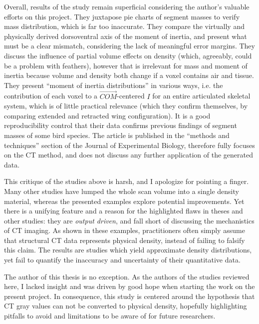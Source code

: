 Overall, results of the \citet{Durston2022} study remain superficial considering the author's valuable efforts on this project.
They juxtapose pie charts of segment masses to verify mass distribution, which is far too inaccurate.
They compare the virtually and physically derived dorsoventral axis of the moment of inertia, and present what must be a clear mismatch, considering the lack of meaningful error margins.
They discuss the influence of partial volume effects on density (which, agreeably, could be a problem with feathers), however that is irrelevant for mass and moment of inertia because volume and density both change if a voxel contains air and tissue.
They present ``moment of inertia distributions'' in various ways, i.e. the contribution of each voxel to a \(\vec{COM}\)-centered \(I\) for an entire articulated skeletal system, which is of little practical relevance (which they confirm themselves, by comparing extended and retracted wing configuration).
It is a good reproducibility control that their data confirms previous findings of segment masses of some bird species.
The article is published in the ``methods and techniques'' section of the Journal of Experimental Biology, therefore fully focuses on the CT method, and does not discuss any further application of the generated data.



This critique of the studies above is harsh, and I apologize for pointing a finger.
Many other studies have lumped the whole scan volume into a single density material, whereas the presented examples explore potential improvements.
Yet there is a unifying feature and a reason for the highlighted flaws in theses and other studies: they are \emph{output driven}, and fall short of discussing the mechanistics of CT imaging.
As shown in these examples, practitioners often simply assume that structural CT data represents physical density, instead of failing to falsify this claim.
The results are studies which yield approximate density distributions, yet fail to quantify the inaccuracy and uncertainty of their quantitative data.


The author of this thesis is no exception.
As the authors of the studies reviewed here, I lacked insight and was driven by good hope when starting the work on the present project.
In consequence, this study is centered around the hypothesis that CT gray values can not be converted to physical density, hopefully highlighting pitfalls to avoid and limitations to be aware of for future researchers.


